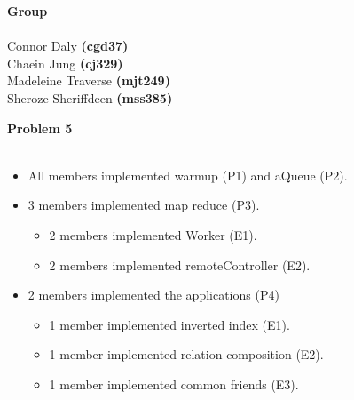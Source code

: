 \documentclass{3110hw}
\begin{document}

\maketitle

\begin{exercises}
	\lstset{basicstyle=\ttfamily,columns=fullflexible,keepspaces=true}

\item[] \textbf{Group} \\ \\
Connor Daly \textbf{(cgd37)} \\
Chaein Jung \textbf{(cj329)} \\
Madeleine Traverse \textbf{(mjt249)} \\
Sheroze Sheriffdeen \textbf{(mss385)} \\

\item[] \textbf{Problem 5} \\ \\
\begin{itemize}
   \item All members implemented warmup (P1) and aQueue (P2).
   \item 3 members implemented map reduce (P3).
   \begin{itemize}
     \item 2 members implemented Worker (E1).
     \item 2 members implemented remoteController (E2).
   \end{itemize}
   \item 2 members implemented the applications (P4)
   \begin{itemize}
     \item 1 member implemented inverted index (E1).
     \item 1 member implemented relation composition (E2).
     \item 1 member implemented common friends (E3).
   \end{itemize}
\end{itemize}

\end{exercises}
\end{document}

